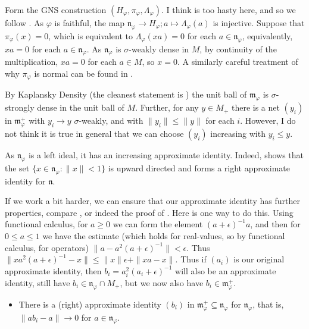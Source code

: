 \documentclass[a4paper,11pt]{article}
\theoremstyle{plain}
\theoremstyle{remark}
\newcommand{\mf}[1]{\mathfrak{#1}}
\begin{document}
Form the GNS construction $(H_\varphi, \pi_\varphi, \Lambda_\varphi)$.  I think \cite{TakesakiII} is too hasty here, and so we follow \cite{KadisonRingroseII}.  As $\varphi$ is faithful, the map $\mf n_\varphi \to H_\varphi; a\mapsto \Lambda_\varphi(a)$ is injective.  Suppose that $\pi_\varphi(x)=0$, which is equivalent to $\Lambda_\varphi(xa)=0$ for each $a\in\mf n_\varphi$, equivalently, $xa=0$ for each $a\in\mf n_\varphi$.  As $\mf n_\varphi$ is $\sigma$-weakly dense in $M$, by continuity of the multiplication, $xa=0$ for each $a\in M$, so $x=0$.  A similarly careful treatment of why $\pi_\varphi$ is normal can be found in \cite{KadisonRingroseII}.

By Kaplansky Density (the cleanest statement is \cite[Theorem~5.3.5, Corollary~5.3.6]{KadisonRingroseI}) the unit ball of $\mf m_\varphi$ is $\sigma$-strongly dense in the unit ball of $M$.  Further, for any $y\in M_+$ there is a net $(y_i)$ in $\mf m_\varphi^+$ with $y_i\to y$ $\sigma$-weakly, and with $\|y_i\| \leq \|y\|$ for each $i$.  However, I do not think it is true in general that we can choose $(y_i)$ increasing with $y_i\leq y$.

As $\mf n_\varphi$ is a left ideal, it has an increasing approximate identity.  Indeed, \cite[Theorem~I.7.4]{TakesakiI} shows that the set $\{ x\in \mf n_\varphi : \|x\|<1 \}$ is upward directed and forms a right approximate identity for $\mf n$.

If we work a bit harder, we can ensure that our approximate identity has further properties, compare \cite[Proposition~3.21]{StratilaZsido}, or indeed the proof of \cite[Theorem~I.7.4]{TakesakiI}.  Here is one way to do this.  Using functional calculus, for $a\geq 0$ we can form the element $(a+\epsilon)^{-1}a$, and then for $0\leq a\leq 1$ we have the estimate (which holds for real-values, so by functional calculus, for operators) $\| a - a^2(a+\epsilon)^{-1}\| < \epsilon$.  Thus $\|xa^2(a+\epsilon)^{-1}-x\| \leq \|x\|\epsilon + \|xa-x\|$.  Thus if $(a_i)$ is our original approximate identity, then $b_i = a_i^2(a_i+\epsilon)^{-1}$ will also be an approximate identity, still have $b_i \in \mf n_\varphi \cap M_+$, but we now also have $b_i \in \mf m_\varphi^+$.
\begin{itemize}
  \item There is a (right) approximate identity $(b_i)$ in $\mf m_\varphi^+ \subseteq \mf n_\varphi$ for $\mf n_\varphi$, that is, $\|ab_i-a\|\to 0$ for $a\in\mf n_\varphi$.
\end{itemize}
\end{document}
